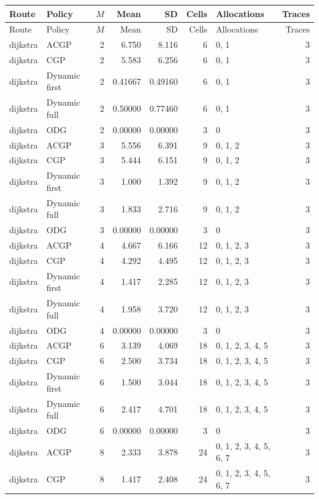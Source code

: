 \documentclass[10pt,a4paper]{article}
\begin{document}
\tiny\setlength{\tabcolsep}{2pt}\begin{longtable}{@{}p{23mm}p{29mm}rrrrp{36mm}r@{}}
\toprule Route & Policy & $M$ & Mean & SD & Cells & Allocations & Traces \\ \midrule\endfirsthead
\toprule Route & Policy & $M$ & Mean & SD & Cells & Allocations & Traces \\ \midrule\endhead
\bottomrule\endfoot
dijkstra & ACGP & 2 & 6.750 & 8.116 & 6 & 0, 1 & 3 \\
dijkstra & CGP & 2 & 5.583 & 6.256 & 6 & 0, 1 & 3 \\
dijkstra & Dynamic first & 2 & 0.41667 & 0.49160 & 6 & 0, 1 & 3 \\
dijkstra & Dynamic full & 2 & 0.50000 & 0.77460 & 6 & 0, 1 & 3 \\
dijkstra & ODG & 2 & 0.00000 & 0.00000 & 3 & 0 & 3 \\
dijkstra & ACGP & 3 & 5.556 & 6.391 & 9 & 0, 1, 2 & 3 \\
dijkstra & CGP & 3 & 5.444 & 6.151 & 9 & 0, 1, 2 & 3 \\
dijkstra & Dynamic first & 3 & 1.000 & 1.392 & 9 & 0, 1, 2 & 3 \\
dijkstra & Dynamic full & 3 & 1.833 & 2.716 & 9 & 0, 1, 2 & 3 \\
dijkstra & ODG & 3 & 0.00000 & 0.00000 & 3 & 0 & 3 \\
dijkstra & ACGP & 4 & 4.667 & 6.166 & 12 & 0, 1, 2, 3 & 3 \\
dijkstra & CGP & 4 & 4.292 & 4.495 & 12 & 0, 1, 2, 3 & 3 \\
dijkstra & Dynamic first & 4 & 1.417 & 2.285 & 12 & 0, 1, 2, 3 & 3 \\
dijkstra & Dynamic full & 4 & 1.958 & 3.720 & 12 & 0, 1, 2, 3 & 3 \\
dijkstra & ODG & 4 & 0.00000 & 0.00000 & 3 & 0 & 3 \\
dijkstra & ACGP & 6 & 3.139 & 4.069 & 18 & 0, 1, 2, 3, 4, 5 & 3 \\
dijkstra & CGP & 6 & 2.500 & 3.734 & 18 & 0, 1, 2, 3, 4, 5 & 3 \\
dijkstra & Dynamic first & 6 & 1.500 & 3.044 & 18 & 0, 1, 2, 3, 4, 5 & 3 \\
dijkstra & Dynamic full & 6 & 2.417 & 4.701 & 18 & 0, 1, 2, 3, 4, 5 & 3 \\
dijkstra & ODG & 6 & 0.00000 & 0.00000 & 3 & 0 & 3 \\
dijkstra & ACGP & 8 & 2.333 & 3.878 & 24 & 0, 1, 2, 3, 4, 5, 6, 7 & 3 \\
dijkstra & CGP & 8 & 1.417 & 2.408 & 24 & 0, 1, 2, 3, 4, 5, 6, 7 & 3 \\

\end{longtable}
\end{document}
